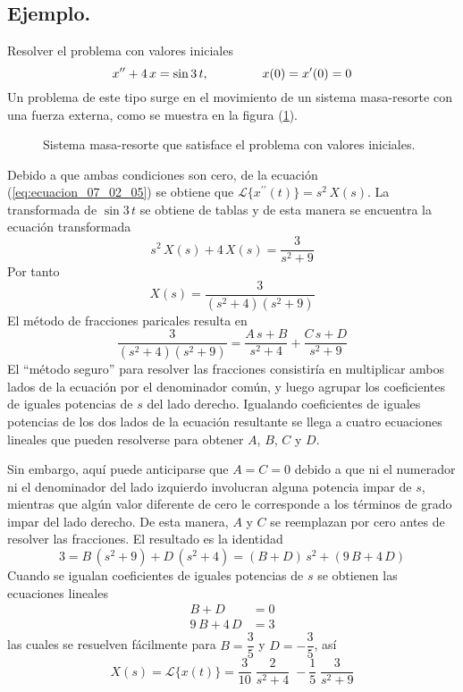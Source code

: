 \subsection*{Ejemplo.}
Resolver el problema con valores iniciales
\[ x^{\prime \prime} + 4 \, x =  \sin 3 \, t, \hspace{1.5cm} x(0) = x^{\prime}(0) = 0 \]
Un problema de este tipo surge en el movimiento de un sistema masa-resorte con una fuerza externa, como se muestra en la figura (\ref{fig:figura_002}).
\begin{figure}[H]
    \centering
    
    \caption{Sistema masa-resorte que satisface el problema con valores iniciales.}
    \label{fig:figura_002}
\end{figure}
Debido a que ambas condiciones son cero, de la ecuación (\ref{eq:ecuacion_07_02_05}) se obtiene que $\mathscr{L} \{x^{\prime \prime} (t) \} = s^{2} \, X(s) $. La transformada de $\sin 3 \, t$ se obtiene de tablas y de esta manera se encuentra la ecuación transformada
\[ s^{2} \, X(s) + 4 \, X(s) = \dfrac{3}{s^{2} + 9} \]
Por tanto
\[ X(s) = \dfrac{3}{(s^{2} + 4)(s^{2} + 9)} \]
El método de fracciones paricales resulta en
\[ \dfrac{3}{(s^{2} + 4)(s^{2} + 9)} = \dfrac{A \, s + B}{s^{2} + 4} + \dfrac{C \, s +D}{s^{2} + 9} \]
El \enquote{método seguro} para resolver las fracciones consistiría en multiplicar ambos lados de la ecuación por el denominador común, y luego agrupar los coeficientes de iguales potencias de $s$ del lado derecho. Igualando coeficientes de iguales potencias de los dos lados de la ecuación resultante se llega a cuatro ecuaciones lineales que pueden resolverse para obtener $A$, $B$, $C$ y $D$.
\par
Sin embargo, aquí puede anticiparse que $A = C = 0$ debido a que ni el numerador ni el denominador del lado izquierdo involucran alguna potencia impar de $s$, mientras que algún valor diferente de cero le corresponde a los términos de grado impar del lado derecho. De esta manera, $A$ y $C$ se reemplazan por cero antes de resolver las fracciones. El resultado es la identidad
\[ 3 = B \, (s^{2} + 9) + D \, (s^{2} + 4) =  (B + D) \, s^{2} + (9 \, B + 4 \, D) \]
Cuando se igualan coeficientes de iguales potencias de $s$ se obtienen las ecuaciones lineales
\begin{align*}
B + D &= 0 \\
9 \, B + 4 \, D &= 3
\end{align*}
las cuales se resuelven fácilmente para $B = \dfrac{3}{5}$ y $D = - \dfrac{3}{5}$, así
\[ X(s) = \mathscr{L} \{x(t) \} = \dfrac{3}{10} \; \dfrac{2}{s^{2} + 4} \; - \dfrac{1}{5} \; \dfrac{3}{s^{2} + 9} \]
